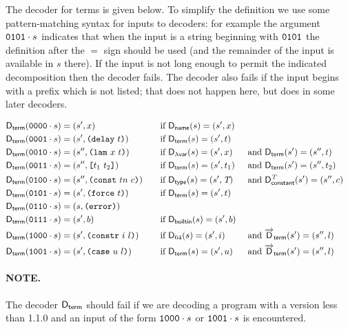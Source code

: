 \noindent The decoder for terms is given below.  To simplify the definition we
use some pattern-matching syntax for inputs to decoders: for example the
argument $\mathtt{0101} \cdot s$ indicates that when the input is a string
beginning with $\mathtt{0101}$ the definition after the $=$ sign should be used
(and the remainder of the input is available in $s$ there).  If the input is not
long enough to permit the indicated decomposition then the decoder fails.  The
decoder also fails if the input begins with a prefix which is not listed; that
does not happen here, but does in some later decoders.

\begin{alignat*}{5}
  \Dterm(\bits{0000} \cdot s)  &= (s', x) &&\quad \text{if } \Dname(s) = (s', x) \\
  \Dterm(\bits{0001} \cdot s)  &= (s', \Delay{t})  &&\quad \text{if}\ \Dterm(s) = (s', t) \\
  \Dterm(\bits{0010} \cdot s)  &= (s'', \Lam{x}{t})  &&\quad \text{if}\ \Dbinder(s) = (s', x)
                                                           &&\ \text{and}\ \Dterm(s') = (s'', t) \\
  \Dterm(\bits{0011} \cdot s)  &= (s'', \Apply{t_1}{t_2}) &&\quad \text{if}\ \Dterm(s) = (s', t_1)
                                                  &&\ \text{and}\ \Dterm(s') = (s'', t_2) \\
  \Dterm(\bits{0100} \cdot s)  &= (s'', \Const{tn}{c}) &&\quad \text{if}\ \Dtype(s) = (s', \tn)
                                                           &&\ \text{and}\ \dConstant{\tn}(s') =(s'', c) \\
  \Dterm(\bits{0101} \cdot s)  &= (s', \Force{t})  &&\quad \text{if}\ \Dterm(s) = (s', t) \\
  \Dterm(\bits{0110} \cdot s)  &= (s, \Error)  && \\
  \Dterm(\bits{0111} \cdot s)  &= (s', b) &&\quad \text{if } \Dbuiltin(s) = (s', b) \\
  \Dterm(\bits{1000} \cdot s)  &= (s', \Constr{i}{l}) &&\quad \text{if } \D_{64}(s) = (s', i) &&\ \text{and}\ \Dlist_{\mathsf{term}}(s') = (s'', l)\\
  \Dterm(\bits{1001} \cdot s)  &= (s', \Kase{u}{l}) &&\quad \text{if } \Dterm(s) = (s', u) &&\ \text{and}\ \Dlist_{\mathsf{term}}(s') = (s'', l)
\end{alignat*}

\paragraph{NOTE.} The decoder $\mathsf{D}_{\mathsf{term}}$ should fail if we are decoding a program
with a version less than 1.1.0 and an input of the form $\mathtt{1000} \cdot s$ or
$\mathtt{1001} \cdot s$ is encountered.

